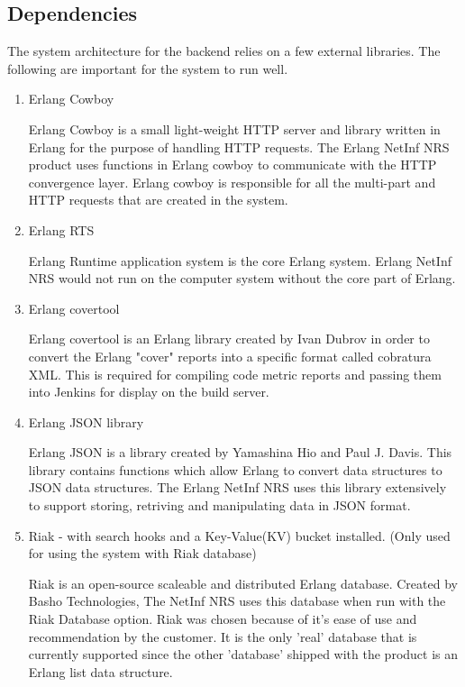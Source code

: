 \newpage
\subsection {Dependencies}

The system architecture for the backend relies on a few external libraries. The following are important for the system to run well. 

\begin {enumerate}
\item Erlang Cowboy \cite{cowboy}

Erlang Cowboy is a small light-weight HTTP server and library written in Erlang for the purpose of handling HTTP requests. The Erlang NetInf NRS product uses functions in Erlang cowboy to communicate with the HTTP convergence layer. Erlang cowboy is responsible for all the multi-part and HTTP requests that are created in the system. 
\item Erlang RTS \cite{erlang}

Erlang Runtime application system is the core Erlang system. Erlang NetInf NRS would not run on the computer system without the core part of Erlang.

\item Erlang covertool \cite{covertool}

Erlang covertool is an Erlang library created by Ivan Dubrov in order to convert the Erlang "cover" reports into a specific format called cobratura XML. This is required for compiling code metric reports and passing them into Jenkins for display on the build server. 

\item Erlang JSON library \cite{json}

Erlang JSON is a library created by Yamashina Hio and Paul J. Davis. This library contains functions which allow Erlang to convert data structures to JSON data structures. The Erlang NetInf NRS uses this library extensively to support storing, retriving and manipulating data in JSON format.
\item Riak \cite{riak} - with search hooks and a Key-Value(KV) bucket installed.
		(Only used for using the system with Riak database)
		
Riak is an open-source scaleable and distributed Erlang database. Created by Basho Technologies, The NetInf NRS uses this database when run with the Riak Database option. Riak was chosen because of it's ease of use and recommendation by the customer. It is the only 'real' database that is currently supported since the other 'database' shipped with the product is an Erlang list data structure.
\end {enumerate}
